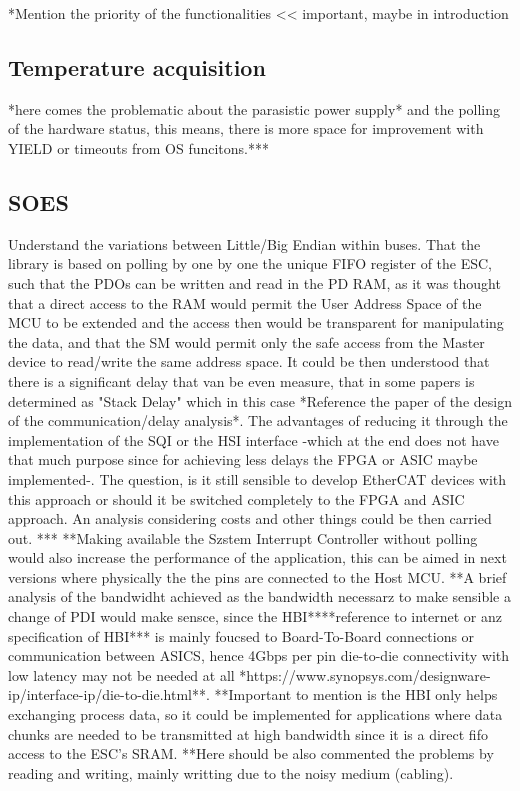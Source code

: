 *Mention the priority of the functionalities << important, maybe in introduction

\subsection{Temperature acquisition}

*here comes the problematic about the parasistic power supply* and the polling of the hardware status, this means, there is more space for improvement with YIELD or timeouts from OS funcitons.***


\subsection{SOES}

Understand the variations between Little/Big Endian within buses. That the library is based on polling by one by one the unique FIFO register of the ESC, such that the PDOs can be written and read in the PD RAM, as it was thought that a direct access to the RAM would permit the User Address Space of the MCU to be extended and the access then would be transparent for manipulating the data,  and that the SM would permit only the safe access from the Master device to read/write the same address space. It could be then understood that there is a significant delay that van be even measure, that in some papers is determined as "Stack Delay" which in this case *Reference the paper of the design of the communication/delay analysis*.
The advantages of reducing it through the implementation of the SQI or the HSI interface -which at the end does not have that much purpose since for achieving less delays the FPGA or ASIC maybe implemented-. The question, is it still sensible to develop EtherCAT devices with this approach or should it be switched completely to the FPGA and ASIC approach. An analysis considering costs and other things could be then carried out. ***
**Making available the Szstem Interrupt Controller without polling would also increase the performance of the application, this can be aimed in next versions where physically the the pins are connected to the Host MCU.
**A brief analysis of the bandwidht achieved as the bandwidth necessarz to make sensible a change of PDI would make sensce, since the HBI****reference to internet or anz specification of HBI*** is mainly foucsed to Board-To-Board connections or communication between ASICS, hence  4Gbps per pin die-to-die connectivity with low latency may not be needed at all *https://www.synopsys.com/designware-ip/interface-ip/die-to-die.html**.
**Important to mention is the HBI only helps exchanging process data, so it could be implemented for applications where data chunks are needed to be transmitted at high bandwidth since it is a direct fifo access to the ESC's SRAM.
**Here should be also commented the problems by reading and writing, mainly writting due to the noisy medium (cabling).

